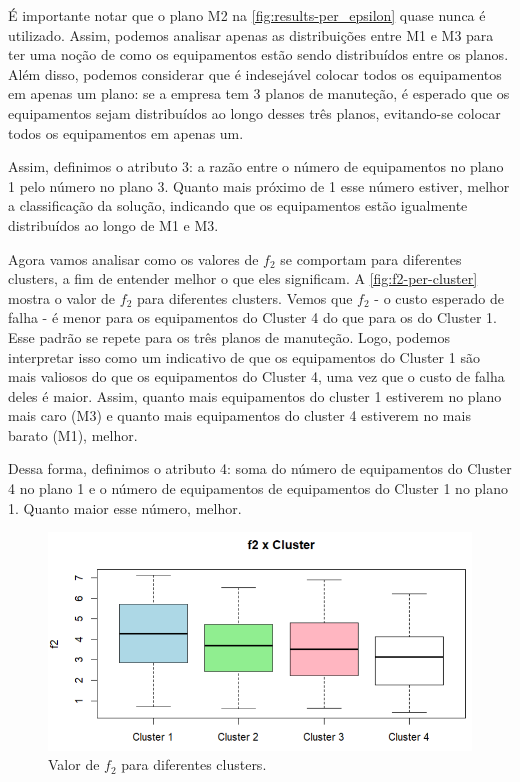 \documentclass[conference]{IEEEtran}
\begin{document}
É importante notar que o plano M2 na \autoref{fig:results-per_epsilon} quase nunca é utilizado. 
Assim, podemos analisar apenas as distribuições entre M1 e M3 para ter uma noção de como os 
equipamentos estão sendo distribuídos entre os planos. Além disso, podemos considerar que é 
indesejável colocar todos os equipamentos em apenas um plano: se a empresa tem 3 planos de manuteção, 
é esperado que os equipamentos sejam distribuídos ao longo desses três planos, evitando-se 
colocar todos os equipamentos em apenas um. 

Assim, definimos o atributo 3: a razão entre o número de equipamentos no plano 1 pelo número no plano 3.
Quanto mais próximo de 1 esse número estiver, melhor a classificação da solução, indicando que 
os equipamentos estão igualmente distribuídos ao longo de M1 e M3.

Agora vamos analisar como os valores de $f_2$ se comportam para diferentes clusters, a fim de 
entender melhor o que eles significam. A \autoref{fig:f2-per-cluster} mostra o valor de $f_2$ para diferentes clusters.
Vemos que $f_2$ - o custo esperado de falha - é menor para os equipamentos do Cluster 4 do que para os 
do Cluster 1. Esse padrão se repete para os três planos de manuteção. Logo, podemos interpretar isso 
como um indicativo de que os equipamentos do Cluster 1 são mais valiosos do que os equipamentos do Cluster 4, uma 
vez que o custo de falha deles é maior. Assim, quanto mais equipamentos do cluster 1 estiverem no plano mais caro 
(M3) e quanto mais equipamentos do cluster 4 estiverem no mais barato (M1), melhor.

Dessa forma, definimos o atributo 4: soma do número de equipamentos do Cluster 4 no plano 1 e o número de equipamentos 
de equipamentos do Cluster 1 no plano 1. Quanto maior esse número, melhor.

\begin{figure}[htbp]
    \centering
    \includegraphics[width=\columnwidth,trim=1 1 1 1,clip]{../images/f2-per-cluster.png}
    \caption{\label{fig:f2-per-cluster}
	Valor de $f_2$ para diferentes clusters.}
\end{figure}
\end{document}
